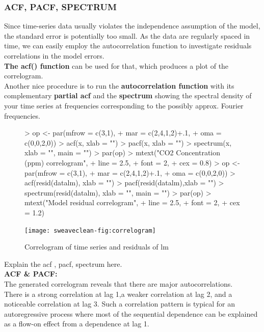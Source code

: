 \documentclass[11pt, a4paper]{article} %
\begin{document}
\pagebreak

\subsubsection{ACF, PACF, SPECTRUM}
\noindent Since time-series data usually violates the independence assumption of the model, the standard error is potentially too small. As the data are regularly spaced in time, we can easily employ the autocorrelation function to investigate residuals correlations in the model errors.\\
\textbf{The acf() function} can be used for that, which produces a plot of the correlogram.\\
Another nice procedure is to run the \textbf{autocorrelation  function} with its complementary \textbf{partial acf} and the \textbf{spectrum}  showing the spectral density of your time series at frequencies corresponding to the possibly approx. Fourier frequencies. \\ 

\begin{figure}[H]
\centering
\begin{Schunk}
\begin{Sinput}
> op <- par(mfrow = c(3,1),
+           mar = c(2,4,1,2)+.1,
+           oma = c(0,0,2,0))
> acf(x, xlab = "")
> pacf(x, xlab = "")
> spectrum(x, xlab = "", main = "")
> par(op)
> mtext("CO2 Concentration (ppm) correlogram", 
+       line = 2.5, 
+       font = 2, 
+       cex = 0.8)
> op <- par(mfrow = c(3,1),
+           mar = c(2,4,1,2)+.1,
+           oma = c(0,0,2,0))
> acf(resid(datalm), xlab = "")
> pacf(resid(datalm),xlab = "")
> spectrum(resid(datalm), xlab = "", main = "")
> par(op)
> mtext("Model residual correlogram", 
+       line = 2.5, 
+       font = 2, 
+       cex = 1.2)
\end{Sinput}
\end{Schunk}
\texttt{[image: sweaveclean-fig:correlogram]}
\caption{Correlogram of time series and residuals of lm}
\label{fig:correlogram}
\end{figure}


Explain the acf , pacf, spectrum here. \\
\textbf{ACF \& PACF:}\\
\noindent The generated correlogram  reveals that there are major autocorrelations. \\
There is a strong correlation at lag 1,a weaker correlation at lag 2, and a noticeable correlation at lag 3. Such a correlation pattern is typical for an autoregressive process where most of the sequential dependence can be explained as a  flow-on effect from a dependence at lag 1.\\
\end{document}
